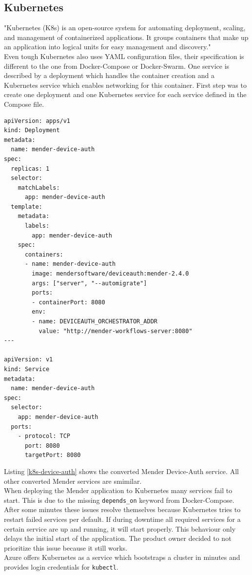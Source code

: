 \subsection{Kubernetes}
"Kubernetes (K8s) is an open-source system for automating deployment, scaling, and management of containerized applications.
It groups containers that make up an application into logical units for easy management and discovery."\cite{k8s}\\
Even tough Kubernetes also uses YAML configuration files, their specification is different to the one from Docker-Compose or Docker-Swarm. One service is described by a deployment which handles the container creation and a Kubernetes service which enables networking for this container. First step was to create one deployment and one Kubernetes service for each service defined in the Compose file.
\begin{code}
  \label{k8s-device-auth}
  \begin{verbatim}
apiVersion: apps/v1
kind: Deployment
metadata:
  name: mender-device-auth
spec:
  replicas: 1
  selector:
    matchLabels:
      app: mender-device-auth
  template:
    metadata:
      labels:
        app: mender-device-auth
    spec:
      containers:
      - name: mender-device-auth
        image: mendersoftware/deviceauth:mender-2.4.0
        args: ["server", "--automigrate"]
        ports:
        - containerPort: 8080
        env:
        - name: DEVICEAUTH_ORCHESTRATOR_ADDR
          value: "http://mender-workflows-server:8080"
---

apiVersion: v1
kind: Service
metadata:
  name: mender-device-auth
spec:
  selector:
    app: mender-device-auth
  ports:
    - protocol: TCP
      port: 8080
      targetPort: 8080
  \end{verbatim}
\end{code}
Listing \ref{k8s-device-auth} shows the converted Mender Device-Auth service. All other converted Mender services are smimilar.\\
When deploying the Mender application to Kubernetes many services fail to start. This is due to the missing \verb|depends_on| keyword from Docker-Compose. After some minutes these issues resolve themselves because Kubernetes tries to restart failed services per default. If during downtime all required services for a certain service are up and running, it will start properly. This behaviour only delays the initial start of the application. The product owner decided to not prioritize this issue because it still works.\\
Azure offers Kubernetes as a service which bootstraps a cluster in minutes and provides login credentials for \verb|kubectl|.

